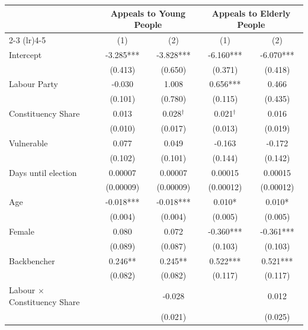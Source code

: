 \begin{table}[H]
\centering
\begin{tabular}{lcccc}
\toprule
& \multicolumn{2}{c}{Appeals to Young People} & \multicolumn{2}{c}{Appeals to Elderly People} \\
\cmidrule(lr){2-3} \cmidrule(lr){4-5}
& (1) & (2) & (1) & (2) \\
\midrule
Intercept & -3.285*** & -3.828*** & -6.160*** & -6.070*** \\
          & (0.413)   & (0.650)   & (0.371)   & (0.418)   \\

Labour Party & -0.030 & 1.008 & 0.656*** & 0.466 \\
              & (0.101) & (0.780) & (0.115) & (0.435) \\

Constituency Share & 0.013 & 0.028$^{\dagger}$ & 0.021$^{\dagger}$  & 0.016  \\
         & (0.010) & (0.017) & (0.013) & (0.019) \\

Vulnerable & 0.077 & 0.049 & -0.163 & -0.172 \\
                  & (0.102) & (0.101) & (0.144) & (0.142) \\

Days until election & 0.00007 & 0.00007 & 0.00015 & 0.00015 \\
                    & (0.00009) & (0.00009) & (0.00012) & (0.00012) \\
                    
Age & -0.018*** & -0.018*** & 0.010* & 0.010* \\
    & (0.004)   & (0.004)   & (0.005) & (0.005) \\

Female & 0.080 & 0.072 & -0.360*** & -0.361*** \\
       & (0.089) & (0.087) & (0.103) & (0.103) \\

Backbencher & 0.246** & 0.245** & 0.522*** & 0.521*** \\
            & (0.082) & (0.082) & (0.117) & (0.117) \\

Labour $\times$ Constituency Share &  & -0.028 &  & 0.012  \\
                         &  & (0.021) &  & (0.025)  \\


\end{tabular}
\end{table}
